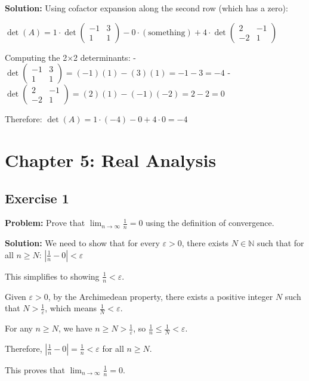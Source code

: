 \textbf{Solution:}
Using cofactor expansion along the second row (which has a zero):

$\det(A) = 1 \cdot \det\begin{pmatrix} -1 & 3 \\ 1 & 1 \end{pmatrix} - 0 \cdot (\text{something}) + 4 \cdot \det\begin{pmatrix} 2 & -1 \\ -2 & 1 \end{pmatrix}$

Computing the 2×2 determinants:
- $\det\begin{pmatrix} -1 & 3 \\ 1 & 1 \end{pmatrix} = (-1)(1) - (3)(1) = -1 - 3 = -4$
- $\det\begin{pmatrix} 2 & -1 \\ -2 & 1 \end{pmatrix} = (2)(1) - (-1)(-2) = 2 - 2 = 0$

Therefore:
$\det(A) = 1 \cdot (-4) - 0 + 4 \cdot 0 = -4$

\section{Chapter 5: Real Analysis}

\subsection{Exercise 1}
\textbf{Problem:} Prove that $\lim_{n \to \infty} \frac{1}{n} = 0$ using the definition of convergence.

\textbf{Solution:}
We need to show that for every $\varepsilon > 0$, there exists $N \in \mathbb{N}$ such that for all $n \geq N$:
$\left|\frac{1}{n} - 0\right| < \varepsilon$

This simplifies to showing $\frac{1}{n} < \varepsilon$.

Given $\varepsilon > 0$, by the Archimedean property, there exists a positive integer $N$ such that $N > \frac{1}{\varepsilon}$, which means $\frac{1}{N} < \varepsilon$.

For any $n \geq N$, we have $n \geq N > \frac{1}{\varepsilon}$, so $\frac{1}{n} \leq \frac{1}{N} < \varepsilon$.

Therefore, $\left|\frac{1}{n} - 0\right| = \frac{1}{n} < \varepsilon$ for all $n \geq N$.

This proves that $\lim_{n \to \infty} \frac{1}{n} = 0$.


